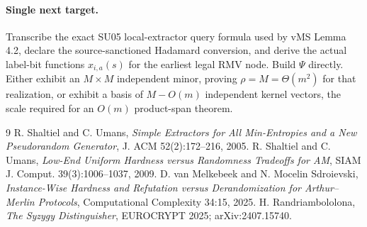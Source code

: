 \documentclass[11pt]{article}
\begin{document}
\paragraph{Single next target.}
Transcribe the exact SU05 local-extractor query formula used by vMS Lemma 4.2, declare the source-sanctioned Hadamard conversion, and derive the actual label-bit functions $x_{i,a}(s)$ for the earliest legal RMV node. Build $\Psi$ directly. Either exhibit an $M\times M$ independent minor, proving $\rho=M=\Theta(m^2)$ for that realization, or exhibit a basis of $M-O(m)$ independent kernel vectors, the scale required for an $O(m)$ product-span theorem.

\begin{thebibliography}{9}
 R. Shaltiel and C. Umans, \emph{Simple Extractors for All Min-Entropies and a New Pseudorandom Generator}, J. ACM 52(2):172--216, 2005.
 R. Shaltiel and C. Umans, \emph{Low-End Uniform Hardness versus Randomness Tradeoffs for AM}, SIAM J. Comput. 39(3):1006--1037, 2009.
 D. van Melkebeek and N. Mocelin Sdroievski, \emph{Instance-Wise Hardness and Refutation versus Derandomization for Arthur--Merlin Protocols}, Computational Complexity 34:15, 2025.
 H. Randriambololona, \emph{The Syzygy Distinguisher}, EUROCRYPT 2025; arXiv:2407.15740.
\end{thebibliography}
\end{document}
